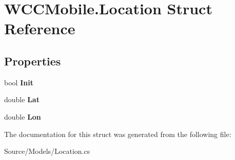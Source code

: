 \hypertarget{struct_w_c_c_mobile_1_1_location}{}\section{W\+C\+C\+Mobile.\+Location Struct Reference}
\label{struct_w_c_c_mobile_1_1_location}
\subsection*{Properties}
\begin{DoxyCompactItemize}
\item 
bool {\bfseries Init}\hypertarget{struct_w_c_c_mobile_1_1_location_a5ab2e1f144bdae43a9bbb6bb899ccc55}{}\label{struct_w_c_c_mobile_1_1_location_a5ab2e1f144bdae43a9bbb6bb899ccc55}

\item 
double {\bfseries Lat}\hypertarget{struct_w_c_c_mobile_1_1_location_a9fc5eb7b6baa78f6165c9fa9ea229482}{}\label{struct_w_c_c_mobile_1_1_location_a9fc5eb7b6baa78f6165c9fa9ea229482}

\item 
double {\bfseries Lon}\hypertarget{struct_w_c_c_mobile_1_1_location_a32e729302f213d15df7bb0c8c6cb3767}{}\label{struct_w_c_c_mobile_1_1_location_a32e729302f213d15df7bb0c8c6cb3767}

\end{DoxyCompactItemize}


The documentation for this struct was generated from the following file\+:\begin{DoxyCompactItemize}
\item 
Source/\+Models/Location.\+cs\end{DoxyCompactItemize}
